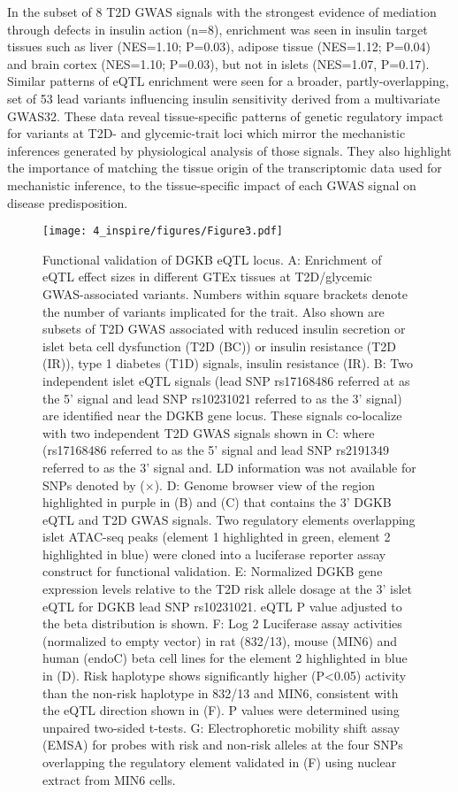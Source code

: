 In the subset of 8 T2D GWAS signals with the strongest evidence of mediation through defects in insulin action (n=8), enrichment was seen in insulin target tissues such as liver (NES=1.10; P=0.03), adipose tissue (NES=1.12; P=0.04) and brain cortex (NES=1.10; P=0.03), but not in islets (NES=1.07, P=0.17). Similar patterns of eQTL enrichment were seen for a broader, partly-overlapping, set of 53 lead variants influencing insulin sensitivity derived from a multivariate GWAS32. 
These data reveal tissue-specific patterns of genetic regulatory impact for variants at T2D- and glycemic-trait loci which mirror the mechanistic inferences generated by physiological analysis of those signals. They also highlight the importance of matching the tissue origin of the transcriptomic data used for mechanistic inference, to the tissue-specific impact of each GWAS signal on disease predisposition.

\begin{figure}
    \centering
    \texttt{[image: 4\_inspire/figures/Figure3.pdf]}
    \caption{Functional validation of DGKB eQTL locus. A: Enrichment of eQTL effect sizes in different GTEx tissues at T2D/glycemic GWAS-associated variants. Numbers within square brackets denote the number of variants implicated for the trait. Also shown are subsets of T2D GWAS associated with reduced insulin secretion or islet beta cell dysfunction (T2D (BC)) or insulin resistance (T2D (IR)), type 1 diabetes (T1D) signals, insulin resistance (IR). B: Two independent islet eQTL signals (lead SNP rs17168486 referred at as the 5’ signal and lead SNP rs10231021 referred to as the 3’ signal) are identified near the DGKB gene locus. These signals co-localize with two independent T2D GWAS signals shown in C: where (rs17168486 referred to as the 5’ signal and lead SNP rs2191349 referred to as the 3’ signal and. LD information was not available for SNPs denoted by (×). D: Genome browser view of the region highlighted in purple in (B) and (C) that contains the 3’ DGKB eQTL and T2D GWAS signals. Two regulatory elements overlapping islet ATAC-seq peaks (element 1 highlighted in green, element 2 highlighted in blue) were cloned into a luciferase reporter assay construct for functional validation. E: Normalized DGKB gene expression levels relative to the T2D risk allele dosage at the 3’ islet eQTL for DGKB lead SNP rs10231021. eQTL P value adjusted to the beta distribution is shown. F: Log 2 Luciferase assay activities (normalized to empty vector) in rat (832/13), mouse (MIN6) and human (endoC) beta cell lines for the element 2 highlighted in blue in (D). Risk haplotype shows significantly higher (P<0.05) activity than the non-risk haplotype in 832/13 and MIN6, consistent with the eQTL direction shown in (F). P values were determined using unpaired two-sided t-tests. G: Electrophoretic mobility shift assay (EMSA) for probes with risk and non-risk alleles at the four SNPs overlapping the regulatory element validated in (F) using nuclear extract from MIN6 cells.}
    \label{fig:c4_f3}
  \end{figure}
  
